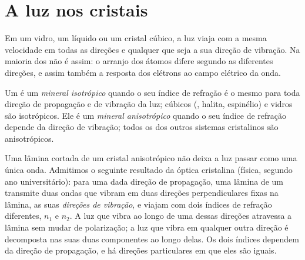 \section{A luz nos cristais}

Em um vidro, um líquido ou um cristal cúbico, a luz viaja com a mesma velocidade em todas as direções e qualquer que seja a sua direção de vibração. Na maioria dos  não é assim: o arranjo dos átomos difere segundo as diferentes direções, e assim também a resposta dos elétrons ao campo elétrico da onda.

\begin{definition}\label{def:b1:optical-mineralogy:anisotropic}
Um  é um \emph{mineral isotrópico} quando o seu índice de refração é o mesmo para toda direção de propagação e de vibração da luz;  cúbicos (, halita, espinélio) e vidros são isotrópicos. Ele é um \emph{mineral anisotrópico} quando o seu índice de refração depende da direção de vibração; todos os  dos outros sistemas cristalinos são anisotrópicos.
\end{definition}

Uma lâmina cortada de um cristal anisotrópico não deixa a luz passar como uma única onda. Admitimos o seguinte resultado da óptica cristalina (física, segundo ano universitário): para uma dada direção de propagação, uma lâmina de um  transmite duas ondas que vibram em duas direções perpendiculares fixas na lâmina, as suas \emph{direções de vibração}, e viajam com dois índices de refração diferentes, $n_1$ e $n_2$. A luz que vibra ao longo de uma dessas direções atravessa a lâmina sem mudar de polarização; a luz que vibra em qualquer outra direção é decomposta nas suas duas componentes ao longo delas. Os dois índices dependem da direção de propagação, e há direções particulares em que eles são iguais.

